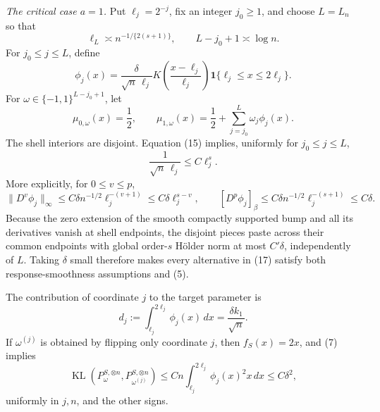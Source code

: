 \emph{The critical case \(a=1\).}
Put \(\ell_j=2^{-j}\), fix an integer \(j_0\ge1\), and choose \(L=L_n\) so that
\[
 \ell_L\asymp n^{-1/\{2(s+1)\}},
 \qquad
 L-j_0+1\asymp\log n.
\tag{15}
\]
For \(j_0\le j\le L\), define
\[
 \phi_j(x)=\frac{\delta}{\sqrt n\,\ell_j}
 K\!\left(\frac{x-\ell_j}{\ell_j}\right)
 \mathbf 1\{\ell_j\le x\le2\ell_j\}.
\tag{16}
\]
For \(\omega\in\{-1,1\}^{L-j_0+1}\), let
\[
 \mu_{0,\omega}(x)=\frac12,
 \qquad
 \mu_{1,\omega}(x)=\frac12+
 \sum_{j=j_0}^L\omega_j\phi_j(x).
\tag{17}
\]
The shell interiors are disjoint.  Equation (15) implies, uniformly for \(j_0\le j\le L\),
\[
 \frac1{\sqrt n\,\ell_j}\le C\ell_j^s.
\tag{18}
\]
More explicitly, for \(0\le v\le p\),
\[
 \lVert D^v\phi_j\rVert_\infty
 \le C\delta n^{-1/2}\ell_j^{-(v+1)}
 \le C\delta\ell_j^{s-v},
 \qquad
 [D^p\phi_j]_{\beta}
 \le C\delta n^{-1/2}\ell_j^{-(s+1)}
 \le C\delta.
\tag{19}
\]
Because the zero extension of the smooth compactly supported bump and all its derivatives vanish at shell endpoints, the disjoint pieces paste across their common endpoints with global order-\(s\) H\"older norm at most \(C'\delta\), independently of \(L\).  Taking \(\delta\) small therefore makes every alternative in (17) satisfy both response-smoothness assumptions and (5).

The contribution of coordinate \(j\) to the target parameter is
\[
 d_j:=\int_{\ell_j}^{2\ell_j}\phi_j(x)\,dx
 =\frac{\delta k_1}{\sqrt n}.
\tag{20}
\]
If \(\omega^{(j)}\) is obtained by flipping only coordinate \(j\), then \(f_S(x)=2x\), and (7) implies
\[
 \operatorname{KL}(P_\omega^{S,\otimes n},
                    P_{\omega^{(j)}}^{S,\otimes n})
 \le Cn\int_{\ell_j}^{2\ell_j}\phi_j(x)^2x\,dx
 \le C\delta^2,
\tag{21}
\]
uniformly in \(j,n\), and the other signs.


